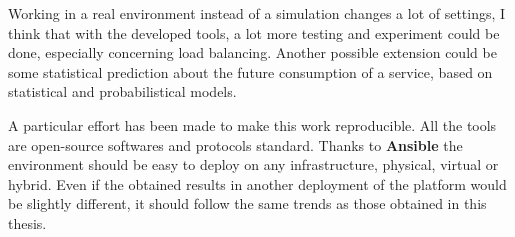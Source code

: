 Working in a real environment instead of a simulation changes a lot of settings,
I think that with the developed tools, a lot more testing and experiment
could be done, especially concerning load balancing. Another possible extension
could be some statistical prediction about the future consumption of a service,
based on statistical and probabilistical models. 
\vspace{1em}

A particular effort has been made to make this work reproducible. All the
tools are open-source softwares and protocols standard.  Thanks to
\textbf{Ansible} the environment should be easy to deploy on any
infrastructure, physical, virtual or hybrid.  Even if the obtained results in
another deployment of the platform would be slightly different, it should
follow the same trends as those obtained in this thesis.
